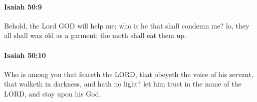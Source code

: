 		\paragraph{Isaiah 50:9} %
			\label{ISAIAH-50-9}

			Behold, the Lord GOD will help me; who is he that shall condemn me? lo, they all shall wax old as a garment; the moth shall eat them up.


		\paragraph{Isaiah 50:10} %
			\label{ISAIAH-50-10}

			Who is among you that feareth the LORD, that obeyeth the voice of his servant, that walketh in darkness, and hath no light? let him trust in the name of the LORD, and stay upon his God.


